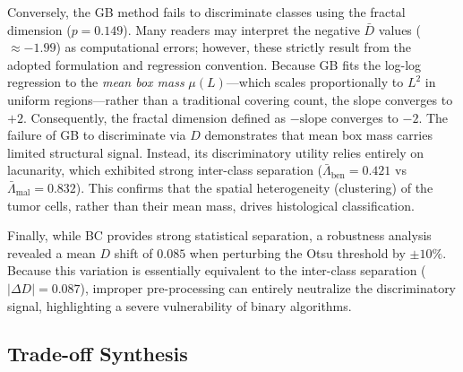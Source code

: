 Conversely, the GB method fails to discriminate classes using the fractal dimension ($p = 0.149$). Many readers may interpret the negative $\bar{D}$ values ($\approx -1.99$) as computational errors; however, these strictly result from the adopted formulation and regression convention. Because GB fits the log-log regression to the \textit{mean box mass} $\mu(L)$—which scales proportionally to $L^2$ in uniform regions—rather than a traditional covering count, the slope converges to $+2$. Consequently, the fractal dimension defined as $-\text{slope}$ converges to $-2$. The failure of GB to discriminate via $D$ demonstrates that mean box mass carries limited structural signal. Instead, its discriminatory utility relies entirely on lacunarity, which exhibited strong inter-class separation ($\bar{\Lambda}_{\text{ben}} = 0.421$ vs $\bar{\Lambda}_{\text{mal}} = 0.832$). This confirms that the spatial heterogeneity (clustering) of the tumor cells, rather than their mean mass, drives histological classification.

Finally, while BC provides strong statistical separation, a robustness analysis revealed a mean $D$ shift of $0.085$ when perturbing the Otsu threshold by $\pm 10\%$. Because this variation is essentially equivalent to the inter-class separation ($|\Delta D| = 0.087$), improper pre-processing can entirely neutralize the discriminatory signal, highlighting a severe vulnerability of binary algorithms.

\subsection{Trade-off Synthesis}
\label{subsec:tradeoffs}

\begin{table}[h]
\centering
\caption{Consolidated trade-off summary across all optimized formulations. $\checkmark$ = best in class; $\sim$ = acceptable; $\times$ = weakest.}
\label{tab:tradeoffs}
\end{table}

